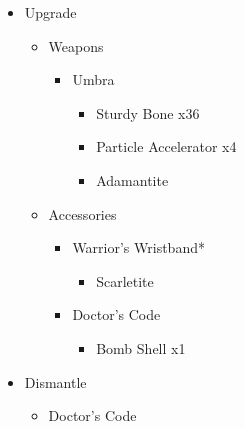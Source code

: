 \begin{upgrade}
	\begin{itemize}
		\item Upgrade
			\begin{itemize}
				\item Weapons
					\begin{itemize}
						\item Umbra
							\begin{itemize}
								\item Sturdy Bone x36
								\item Particle Accelerator x4
								\item Adamantite
							\end{itemize}
					\end{itemize}
				\item Accessories
					\begin{itemize}
						\item Warrior's Wristband*
							\begin{itemize}
								\item Scarletite
							\end{itemize}
						\item Doctor's Code
							\begin{itemize}
								\item Bomb Shell x1
							\end{itemize}
					\end{itemize}
			\end{itemize}
		\item Dismantle
			\begin{itemize}
				\item Doctor's Code
			\end{itemize}
	\end{itemize}
\end{upgrade}
\vfill

